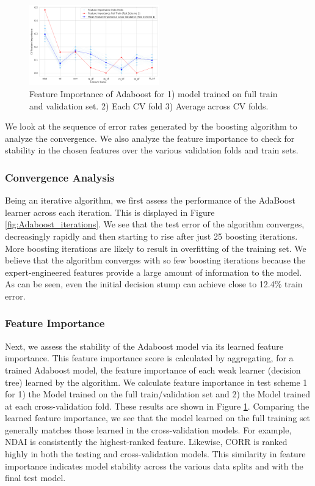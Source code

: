 \documentclass[11pt, letterpaper, journal]{IEEEtran}
\begin{document}
\begin{figure}[h]
    \centering
    \includegraphics[width=0.5\textwidth]{statics/Feature_importance_test_scheme1_tr_23_te_1.png}
    \caption{Feature Importance of Adaboost for 1) model trained on full train and validation set. 2) Each CV fold 3) Average across CV folds.}
    \label{fig:Feature_importance ts1}
\end{figure}

We look at the sequence of error rates generated by the boosting algorithm to analyze the convergence. We also analyze the feature importance to check for stability in the chosen features over the various validation folds and train sets.

\subsubsection{Convergence Analysis}
Being an iterative algorithm, we first assess the performance of the AdaBoost learner across each iteration. This is displayed in Figure \ref{fig:Adaboost_iterations}. We see that the test error of the algorithm converges, decreasingly rapidly and then starting to rise after just 25 boosting iterations. More boosting iterations are likely to result in overfitting of the training set. We believe that the algorithm converges with so few boosting iterations because the expert-engineered features provide a large amount of information to the model. As can be seen, even the initial decision stump can achieve close to 12.4\% train error.

\subsubsection{Feature Importance}
Next, we assess the stability of the Adaboost model via its learned feature importance. This feature importance score is calculated by aggregating, for a trained Adaboost model, the feature importance of each weak learner (decision tree) learned by the algorithm. We calculate feature importance in test scheme 1 for 1) the Model trained on the full train/validation set and 2) the Model trained at each cross-validation fold. These results are shown in Figure \ref{fig:Feature_importance ts1}. Comparing the learned feature importance, we see that the model learned on the full training set generally matches those learned in the cross-validation models. For example, NDAI is consistently the highest-ranked feature. Likewise, CORR is ranked highly in both the testing and cross-validation models. This similarity in feature importance indicates model stability across the various data splits and with the final test model. 
\end{document}
